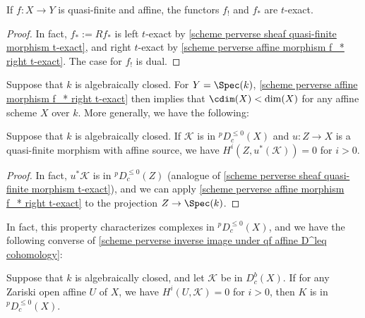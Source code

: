 \begin{corollary}\label{scheme perverse quasi-finite affine f_* f_! t-exact}
If $f:X\to Y$ is quasi-finite and affine, the functors $f_!$ and $f_*$ are $t$-exact.
\end{corollary}
\begin{proof}
In fact, $f_*:=Rf_*$ is left $t$-exact by \cref{scheme perverse sheaf quasi-finite morphism t-exact}, and right $t$-exact by \cref{scheme perverse affine morphism f_* right t-exact}. The case for $f_!$ is dual. 
\end{proof}

Suppose that $k$ is algebraically closed. For $Y=\Spec(k)$, \cref{scheme perverse affine morphism f_* right t-exact} then implies that $\cdim(X)<\dim(X)$ for any affine scheme $X$ over $k$. More generally, we have the following:

\begin{corollary}\label{scheme perverse inverse image under qf affine D^leq cohomology}
Suppose that $k$ is algebraically closed. If $\mathscr{K}$ is in ${^p\!D^{\leq 0}_c}(X)$ and $u:Z\to X$ is a quasi-finite morphism with affine source, we have $H^i(Z,u^*(\mathscr{K}))=0$ for $i>0$.
\end{corollary}
\begin{proof}
In fact, $u^*\mathscr{K}$ is in ${^p\!D_c^{\leq 0}}(Z)$ (analogue of \cref{scheme perverse sheaf quasi-finite morphism t-exact}), and we can apply \cref{scheme perverse affine morphism f_* right t-exact} to the projection $Z\to\Spec(k)$.
\end{proof}

In fact, this property characterizes complexes in ${^p\!D^{\leq 0}_c}(X)$, and we have the following converse of \cref{scheme perverse inverse image under qf affine D^leq cohomology}:

\begin{corollary}\label{scheme perverse D^leq if negative cohomology on open affine}
Suppose that $k$ is algebraically closed, and let $\mathscr{K}$ be in $D^b_c(X)$. If for any Zariski open affine $U$ of $X$, we have $H^i(U,\mathscr{K})=0$ for $i>0$, then $K$ is in ${^p\!D_c^{\leq 0}}(X)$.
\end{corollary}

